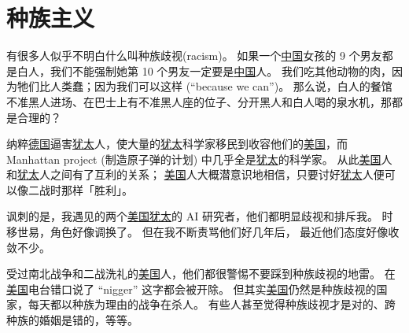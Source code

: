 \documentclass[12pt]{report}
\begin{document}
{%


\chapter{种族主义}

有很多人似乎不明白什么叫种族歧视(racism)。 如果一个\uline{中国}女孩的 9 个男友都是白人，我们不能强制她第 10 个男友一定要是\uline{中国}人。 我们吃其他动物的肉，因为牠们比人类蠢；因为我们可以这样 (``because we can'')。 那么说，白人的餐馆不准黑人进场、在巴士上有不准黑人座的位子、分开黑人和白人喝的泉水机，那都是合理的？

纳粹\uline{德国}逼害\uline{犹太}人，使大量的\uline{犹太}科学家移民到收容他们的\uline{美国}，而 Manhattan project (制造原子弹的计划) 中几乎全是\uline{犹太}的科学家。 从此\uline{美国}人和\uline{犹太}人之间有了互利的关系； \uline{美国}人大概潜意识地相信，只要讨好\uline{犹太}人便可以像二战时那样「胜利」。

讽刺的是，我遇见的两个\uline{美国}\uline{犹太}的 AI 研究者，他们都明显歧视和排斥我。 时移世易，角色好像调换了。 但在我不断责骂他们好几年后， 最近他们态度好像收敛不少。

受过南北战争和二战洗礼的\uline{美国}人，他们都很警惕不要踩到种族歧视的地雷。 在\uline{美国}电台错口说了 ``nigger'' 这字都会被开除。 但其实\uline{美国}仍然是种族歧视的国家，每天都以种族为理由的战争在杀人。 有些人甚至觉得种族歧视才是对的、跨种族的婚姻是错的，等等。

}
\end{document}
